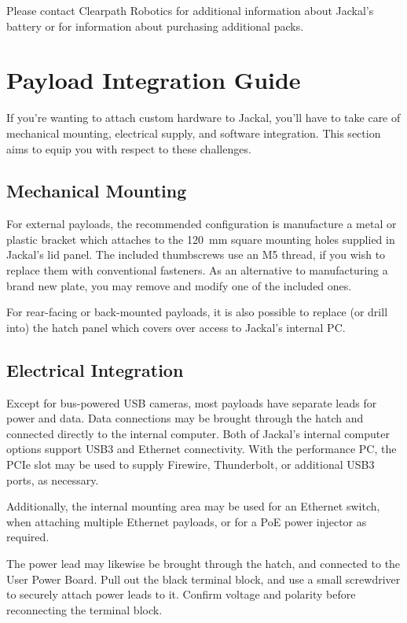 \documentclass[]{clearpath-latex/clearpath-manual}
\begin{document}
Please contact Clearpath Robotics for additional information about Jackal's battery or
for information about purchasing additional packs.


\section{Payload Integration Guide}

If you're wanting to attach custom hardware to Jackal, you'll have to take care of
mechanical mounting, electrical supply, and software integration. This section
aims to equip you with respect to these challenges.


\subsection{Mechanical Mounting}

For external payloads, the recommended configuration is manufacture a metal or plastic bracket
which attaches to the \SI{120}{\mm} square mounting holes supplied in Jackal's lid
panel. The included thumbscrews use an M5 thread, if you wish to replace them with conventional
fasteners. As an alternative to manufacturing a brand new plate, you may remove and modify one
of the included ones.

For rear-facing or back-mounted payloads, it is also possible to replace (or drill into) the
hatch panel which covers over access to Jackal's internal PC.

\subsection{Electrical Integration}\label{payload-elec}

Except for bus-powered USB cameras, most payloads have separate leads for power and data. Data
connections may be brought through the hatch and connected directly to the internal computer. Both
of Jackal's internal computer options support USB3 and Ethernet connectivity. With the performance
PC, the PCIe slot may be used to supply Firewire, Thunderbolt, or additional USB3 ports, as necessary.

Additionally, the internal mounting area may be used for an Ethernet switch, when attaching multiple
Ethernet payloads, or for a PoE power injector as required.

The power lead may likewise be brought through the hatch, and connected to the User Power Board. Pull
out the black terminal block, and use a small screwdriver to securely attach power leads to it.
Confirm voltage and polarity before reconnecting the terminal block.
\end{document}
